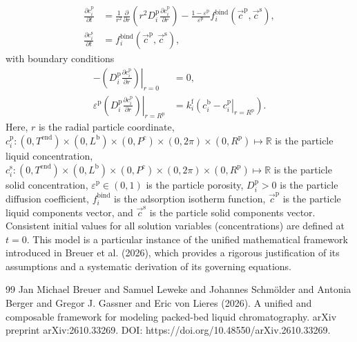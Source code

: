 \documentclass{article}
\begin{document}
\begin{align}
    \frac{\partial c^{\mathrm{p}}_{i}}{\partial t}
    &= \frac{1}{r^{2}} \frac{\partial }{\partial r} \left( r^{2} D^{\mathrm{p}}_{i} \frac{\partial c^{\mathrm{p}}_{i}}{\partial r} \right)
        - \frac{1 - \varepsilon^{\mathrm{p}}}{\varepsilon^{\mathrm{p}}}f^{\mathrm{bind}}_{i}\left( \vec{c}^{\mathrm{p}}, \vec{c}^{\mathrm{s}} \right),
    \\
    \frac{\partial c^{\mathrm{s}}_{i}}{\partial t}
    &= f^{\mathrm{bind}}_{i}\left( \vec{c}^{\mathrm{p}}, \vec{c}^{\mathrm{s}} \right),
\end{align}
with boundary conditions
\begin{align}
    - \left. \left( D^{\mathrm{p}}_{i} \frac{\partial c^{\mathrm{p}}_{i}}{\partial r} \right) \right|_{r=0}
    &= 0,
    \\
    \varepsilon^{\mathrm{p}} \left. \left( D^{\mathrm{p}}_{i} \frac{\partial c^{\mathrm{p}}_{i}}{\partial r} \right)\right|_{r = R^{\mathrm{p}}}
    &= k^{\mathrm{f}}_{i} \left. \left( c^{\mathrm{b}}_{i} - c^{\mathrm{p}}_{i} \right|_{r = R^{\mathrm{p}}} \right).
\end{align}
Here, $r$ is the radial particle coordinate, $c^{\mathrm{p}}_{i}\colon (0, T^{\mathrm{end}}) \times (0, L^{\mathrm{b}})\times (0, P^{\mathrm{c}})\times (0, 2\pi)\times (0, R^{\mathrm{p}}) \mapsto \mathbb{R}$ is the particle liquid concentration, $c^{\mathrm{s}}_{i}\colon (0, T^{\mathrm{end}}) \times (0, L^{\mathrm{b}})\times (0, P^{\mathrm{c}})\times (0, 2\pi)\times (0, R^{\mathrm{p}}) \mapsto \mathbb{R}$ is the particle solid concentration, $\varepsilon^{\mathrm{p}}\in (0, 1)$ is the particle porosity, $D^{\mathrm{p}}_{i}> 0$ is the particle diffusion coefficient, $f^{\mathrm{bind}}_{i}$ is the adsorption isotherm function, $\vec{c}^{\mathrm{p}}$ is the particle liquid components vector, and $\vec{c}^{\mathrm{s}}$ is the particle solid components vector.
Consistent initial values for all solution variables (concentrations) are defined at $t = 0$.
This model is a particular instance of the unified mathematical framework introduced in Breuer et al. (2026), which provides a rigorous justification of its assumptions and a systematic derivation of its governing equations.
\begin{thebibliography}{99}
     Jan Michael Breuer and Samuel Leweke and Johannes Schmölder and Antonia Berger and Gregor J. Gassner and Eric von Lieres (2026). A unified and composable framework for modeling packed-bed liquid chromatography. arXiv preprint arXiv:2610.33269. DOI: https://doi.org/10.48550/arXiv.2610.33269.
\end{thebibliography}
\end{document}
